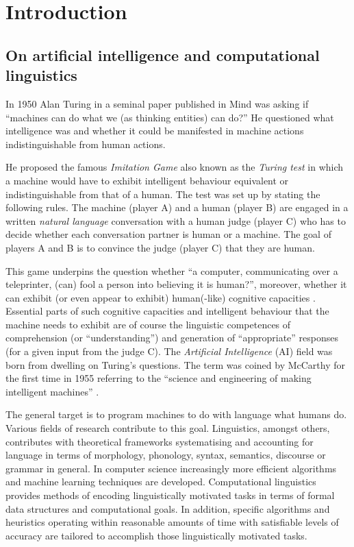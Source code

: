 \chapter{Introduction}
\label{ch:introduction}

\section{On artificial intelligence and computational linguistics}
    In 1950 Alan Turing in a seminal paper \citep{Turing1950} published in Mind was asking if ``machines can do what we (as thinking entities) can do?'' He questioned what intelligence was and whether it could be manifested in machine actions indistinguishable from human actions. 
    
    He proposed the famous \textit{Imitation Game} also known as the \textit{Turing test} in which a machine would have to exhibit intelligent behaviour equivalent or indistinguishable from that of a human. The test was set up by stating the following rules. The machine (player A) and a human (player B) are engaged in a written \textit{natural language} conversation with a human judge (player C) who has to decide whether each conversation partner is human or a machine. The goal of players A and B is to convince the judge (player C) that they are human. 
    
    This game underpins the question whether ``a computer, communicating over a teleprinter, (can) fool a person into believing it is human?'', moreover, whether it can exhibit (or even appear to exhibit) human(-like) cognitive capacities \citep{Harnad1992}. Essential parts of such cognitive capacities and intelligent behaviour that the machine needs to exhibit are of course the linguistic competences of comprehension (or ``understanding'') and generation of ``appropriate'' responses (for a given input from the judge C). The \textit{Artificial Intelligence} (AI) field was born from dwelling on Turing's questions. The term was coined by McCarthy for the first time in 1955 referring to the ``science and engineering of making intelligent machines'' \citep{McCarthy1955}.
    
    The general target is to program machines to do with language what humans do. Various fields of research contribute to this goal. Linguistics, amongst others, contributes with theoretical frameworks systematising and accounting for language in terms of morphology, phonology, syntax, semantics, discourse or grammar in general. In computer science increasingly more efficient algorithms and machine learning techniques are developed. Computational linguistics provides methods of encoding linguistically motivated tasks in terms of formal data structures and computational goals. In addition, specific algorithms and heuristics operating within reasonable amounts of time with satisfiable levels of accuracy are tailored to accomplish those linguistically motivated tasks.
    
